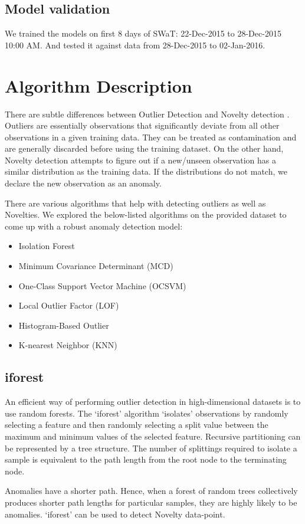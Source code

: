 \documentclass{article}
\begin{document}
\subsection{Model validation}
We trained the models on first 8 days of SWaT: \textsf{22-Dec-2015 to 28-Dec-2015 10:00 AM}. And tested  it against data from \textsf{28-Dec-2015 to 02-Jan-2016}. 

\section{Algorithm Description}
There are subtle differences between Outlier Detection and Novelty detection \cite{twelve}. Outliers are essentially observations that significantly
deviate from all other observations in a given training data. They can be treated as contamination and are generally discarded before using the training dataset. 
On the other hand, Novelty detection attempts to figure out if a new/unseen observation has a similar distribution as the training data. If the distributions do not match, we declare the new observation as an anomaly. 

There are various algorithms that help with detecting outliers as well as Novelties. We explored the below-listed algorithms on the provided dataset to come up with a robust anomaly detection model:
\begin{itemize}
    \item \textsf{Isolation Forest}
    \item \textsf{Minimum Covariance Determinant (MCD)}
    \item \textsf{One-Class Support Vector Machine (OCSVM)}
    \item \textsf{Local Outlier Factor (LOF)}
    \item \textsf{Histogram-Based Outlier}
    \item \textsf{K-nearest Neighbor (KNN)}    
\end{itemize}

\subsection{iforest}
An efficient way of performing outlier detection in high-dimensional datasets is to use random forests. The `iforest' \cite{five} algorithm `isolates' observations by randomly selecting a feature and then randomly selecting a split value between the maximum and minimum values of the selected feature. Recursive partitioning can be represented by a tree structure. The number of splittings required to isolate a sample is equivalent to the path length from the root node to the terminating node. \par 
Anomalies have a shorter path. Hence, when a forest of random trees collectively produces shorter path lengths for particular samples, they are highly likely to be anomalies. `iforest' can be used to detect Novelty data-point. 
\end{document}
